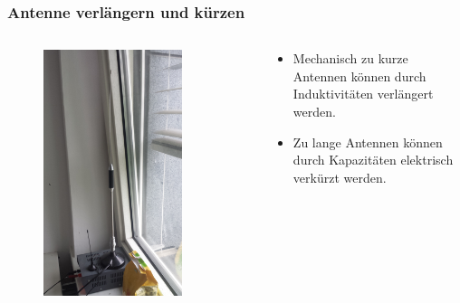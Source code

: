 \begin{frame}
  \frametitle{Antenne verlängern und kürzen}
  \begin{columns}[c]
    \column[c]{5cm}
    \begin{center}
      \begin{figure}
        \includegraphics[width=0.8\textwidth,height=.75\textheight,keepaspectratio]{a09/Verkurzte_10m_Antenne.jpg}
      \end{figure}
    \end{center}
    \column{5cm} \large
    \begin{center}
      \begin{itemize}
        \item Mechanisch zu kurze Antennen können durch Induktivitäten verlängert werden.
        \item Zu lange Antennen können durch Kapazitäten elektrisch verkürzt werden.
      \end{itemize}
    \end{center}
  \end{columns}
\end{frame}


